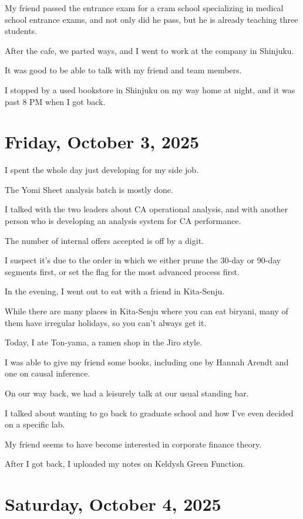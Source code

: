 \documentclass[uplatex]{jsarticle}
\begin{document}
My friend passed the entrance exam for a cram school specializing in medical school entrance exams, and not only did he pass, but he is already teaching three students.

After the cafe, we parted ways, and I went to work at the company in Shinjuku.

It was good to be able to talk with my friend and team members.

I stopped by a used bookstore in Shinjuku on my way home at night, and it was past 8 PM when I got back.


\section{Friday, October 3, 2025}

I spent the whole day just developing for my side job.

The Yomi Sheet analysis batch is mostly done.

I talked with the two leaders about CA operational analysis, and with another person who is developing an analysis system for CA performance.

The number of internal offers accepted is off by a digit.

I suspect it's due to the order in which we either prune the 30-day or 90-day segments first, or set the flag for the most advanced process first.

In the evening, I went out to eat with a friend in Kita-Senju.

While there are many places in Kita-Senju where you can eat biryani, many of them have irregular holidays, so you can't always get it.

Today, I ate Ton-yama, a ramen shop in the Jiro style.

I was able to give my friend some books, including one by Hannah Arendt and one on causal inference.

On our way back, we had a leisurely talk at our usual standing bar.

I talked about wanting to go back to graduate school and how I've even decided on a specific lab.

My friend seems to have become interested in corporate finance theory.

After I got back, I uploaded my notes on Keldysh Green Function.


\section{Saturday, October 4, 2025}
\end{document}
